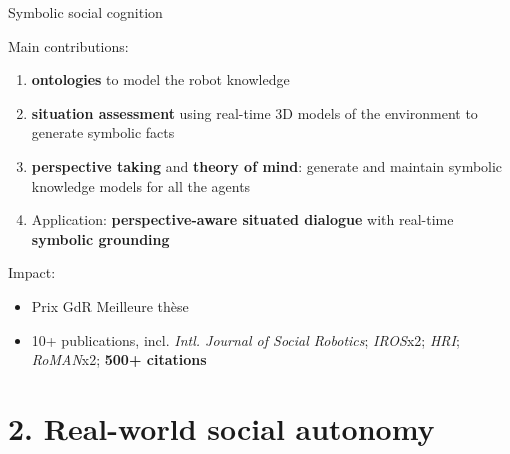 \documentclass[xcolor=table]{beamer}
\begin{document}
\begin{frame}{Symbolic social cognition}

Main contributions:

    \begin{enumerate}
        \item \textbf{ontologies} to model the robot knowledge
        \item \textbf{situation assessment} using real-time 3D models of the
            environment to generate symbolic facts
        \item \textbf{perspective taking} and \textbf{theory of mind}: generate and
            maintain symbolic knowledge models for all the agents
        \item Application: \textbf{perspective-aware situated dialogue} with real-time \textbf{symbolic
            grounding}
    \end{enumerate}

Impact:
    \begin{itemize}
        \item Prix GdR Meilleure thèse
        \item 10+ publications, incl. \emph{Intl. Journal of Social Robotics};
            \emph{IROS}x2; \emph{HRI}; \emph{RoMAN}x2; \textbf{500+ citations}
    \end{itemize}
\end{frame}

\section{2. Real-world social autonomy}
\end{document}
